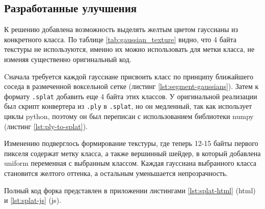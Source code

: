 \subsection{Разработанные улучшения}

К решению добавлена возможность выделять желтым цветом гауссианы из конкретного класса. По таблице \ref{tab:gaussian_texture} видно, что 4 байта текстуры не используются, именно их можно использовать для метки класса, не изменяя существенно оригинальный код.

Cначала требуется каждой гауссиане присвоить класс по принципу ближайшего соседа в размеченной воксельной сетке (листинг \ref{lst:segment-gaussians}). Затем к формату \texttt{.splat} добавить еще 4 байта этих классов. У оригинальной реализации был скрипт конвертера из \texttt{.ply} в \texttt{.splat}, но он медленный, так как использует циклы python, поэтому он был переписан с использованием библиотеки numpy (листинг \ref{lst:ply-to-splat}).

Изменению подверглось формирование текстуры, где теперь 12-15 байты первого пикселя содержат метку класса, а также вершинный шейдер, в который добавлена uniform переменная с выбранным классом. Каждая гауссиана выбранного класса становится желтого оттенка, а остальным уменьшается непрозрачность.

Полный код форка представлен в приложении листингами \ref{lst:splat-html} (html) и \ref{lst:splat-js} (js).
